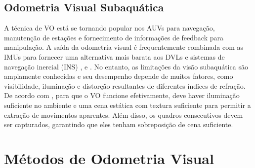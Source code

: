 \subsection{Odometria Visual Subaquática}
\label{sec:odometriavisualsubaquatica}

A técnica de VO está se tornando popular nos AUVs para navegação, manutenção de estações e fornecimento de informações de feedback para manipulação.
A saída da odometria visual é frequentemente combinada com as IMUs para fornecer uma alternativa mais barata aos DVLs e sistemas de navegação inercial (INS) \cite{bellavia2017selective}, \cite{wirth2013visual} e \cite{yousif2015overview}. No entanto, as limitações da visão subaquática são amplamente conhecidas e seu desempenho depende de muitos fatores, como visibilidade, iluminação e distorção resultantes de diferentes índices de refração. De acordo com \cite{fraundorfer2011visual}, para que o VO funcione efetivamente, deve haver iluminação suficiente no ambiente e uma cena estática com textura suficiente para permitir a extração de movimentos aparentes. Além disso, os quadros consecutivos devem ser capturados, garantindo que eles tenham sobreposição de cena suficiente.

\section{Métodos de Odometria Visual}
\label{sec:metodosdeodometriavisual}

